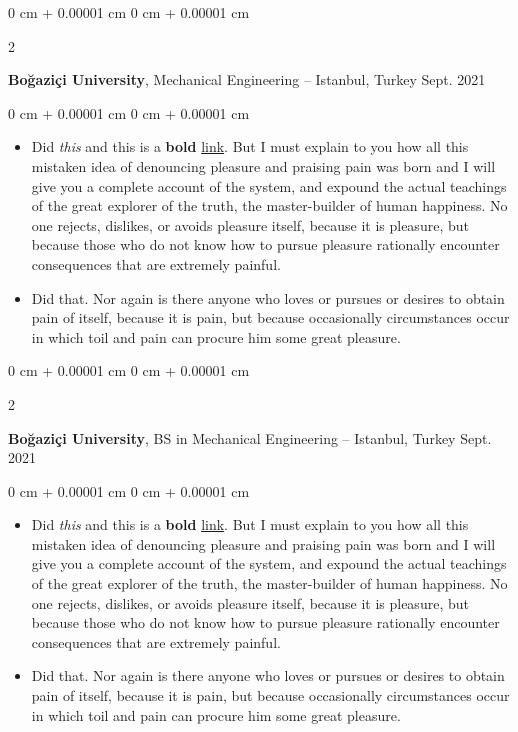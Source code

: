 \documentclass[10pt, letterpaper]{article}
\newenvironment{highlights}{
    \begin{itemize}[
        topsep=0.10 cm,
        parsep=0.10 cm,
        partopsep=0pt,
        itemsep=0pt,
        leftmargin=0 cm + 10pt
    ]
}{
    \end{itemize}
} %
\newenvironment{onecolentry}{
    \begin{adjustwidth}{
        0 cm + 0.00001 cm
    }{
        0 cm + 0.00001 cm
    }
}{
    \end{adjustwidth}
} %
\newenvironment{twocolentry}[2][]{
    \onecolentry
    \def\secondColumn{#2}
    \setcolumnwidth{\fill, 4.5 cm}
    \begin{paracol}{2}
}{
    \switchcolumn \raggedleft \secondColumn
    \end{paracol}
    \endonecolentry
} %
\begin{document}
        \vspace{0.2 cm}

        \begin{twocolentry}{
            Sept. 2021
        }
            \textbf{Boğaziçi University}, Mechanical Engineering -- Istanbul, Turkey\end{twocolentry}

        \vspace{0.10 cm}
        \begin{onecolentry}
            \begin{highlights}
                \item Did \textit{this} and this is a \textbf{bold} \href{https://example.com}{link}. But I must explain to you how all this mistaken idea of denouncing pleasure and praising pain was born and I will give you a complete account of the system, and expound the actual teachings of the great explorer of the truth, the master-builder of human happiness. No one rejects, dislikes, or avoids pleasure itself, because it is pleasure, but because those who do not know how to pursue pleasure rationally encounter consequences that are extremely painful.
                \item Did that. Nor again is there anyone who loves or pursues or desires to obtain pain of itself, because it is pain, but because occasionally circumstances occur in which toil and pain can procure him some great pleasure.
            \end{highlights}
        \end{onecolentry}


        \vspace{0.2 cm}

        \begin{twocolentry}{
            Sept. 2021
        }
            \textbf{Boğaziçi University}, BS in Mechanical Engineering -- Istanbul, Turkey\end{twocolentry}

        \vspace{0.10 cm}
        \begin{onecolentry}
            \begin{highlights}
                \item Did \textit{this} and this is a \textbf{bold} \href{https://example.com}{link}. But I must explain to you how all this mistaken idea of denouncing pleasure and praising pain was born and I will give you a complete account of the system, and expound the actual teachings of the great explorer of the truth, the master-builder of human happiness. No one rejects, dislikes, or avoids pleasure itself, because it is pleasure, but because those who do not know how to pursue pleasure rationally encounter consequences that are extremely painful.
                \item Did that. Nor again is there anyone who loves or pursues or desires to obtain pain of itself, because it is pain, but because occasionally circumstances occur in which toil and pain can procure him some great pleasure.
            \end{highlights}
        \end{onecolentry}
\end{document}

